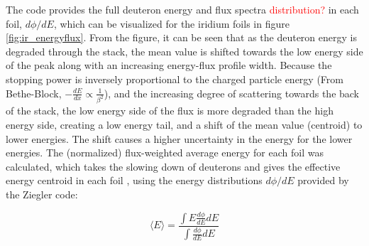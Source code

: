 The code provides the full deuteron energy and flux spectra \textcolor{red}{distribution?} in each foil, $d\phi/dE$, which can be visualized for the iridium foils in figure \ref{fig:ir_energyflux}. From the figure, it can be seen that as the deuteron energy is degraded through the stack, the mean value is shifted towards the low energy side of the peak along with an increasing energy-flux profile width. Because the stopping power is inversely proportional to the charged particle energy (From Bethe-Block, $-\frac{dE}{dx}\propto \frac{1}{\beta^2}$), and the increasing degree of scattering towards the back of the stack, the low energy side of the flux is more degraded than the high energy side, creating a low energy tail, and a shift of the mean value (centroid) to lower energies. The shift causes a higher uncertainty in the energy for the lower energies. The (normalized) flux-weighted average energy for each foil was calculated, which takes the slowing down of deuterons and gives the effective energy centroid in each foil \cite{Voyles2019}, using the energy distributions $d\phi/dE$ provided by the Ziegler code:

\begin{equation} \label{eq:flux_weighted_average_energy}
    \langle E \rangle = \frac{\int E \frac{d\phi}{dE}dE}{\int \frac{d\phi}{dE}dE}
\end{equation}





